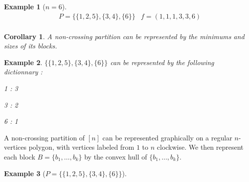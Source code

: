\documentclass[12pt]{report}
\newtheorem*{example}{Example}
\newtheorem*{cor}{Corollary}
\begin{document}
\begin{example}[$n = 6$]
    \begin{align*}
        &P = \{\{1, 2, 5\}, \{3, 4\}, \{6\}\}
        &f = (1, 1, 1, 3, 3, 6)\\
    \end{align*}
\end{example}

\begin{cor}
    A non-crossing partition can be represented by the minimums
    and sizes of its blocks.
\end{cor}

\begin{example}
    $\{\{1, 2, 5\}, \{3, 4\}, \{6\}\}$ can be represented by
    the following dictionnary :\\
    \begin{itemize*}
        \item 1 : 3\\
        \item 3 : 2\\
        \item 6 : 1\\
    \end{itemize*}
\end{example}

A non-crossing partition of $[n]$ can be represented graphically
on a regular $n$-vertices polygon, with vertices labeled from $1$
to $n$ clockwise. We then represent each block $B = \{b_1, \ldots, b_k\}$
by the convex hull of $\{b_1, \ldots, b_k\}$.\\

\begin{example}[$P = \{\{1, 2, 5\}, \{3, 4\}, \{6\}\}$]
    ~\\
    \begin{center}
    \end{center}
\end{example}
\end{document}

